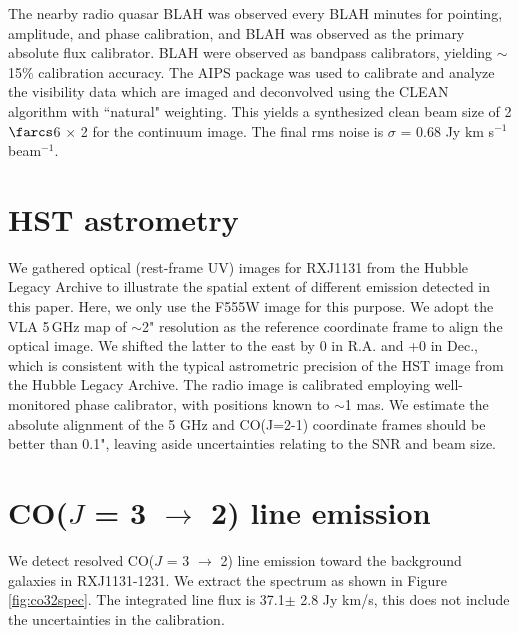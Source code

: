 The nearby radio quasar BLAH was observed every BLAH minutes for
pointing, amplitude, and phase calibration, and BLAH was observed as the
primary
absolute flux calibrator. BLAH were observed as bandpass calibrators, yielding
$\sim$15\% calibration accuracy.
The AIPS package was used to calibrate and analyze the visibility data which
are imaged and deconvolved using
the CLEAN algorithm with ``natural" weighting. This yields a synthesized clean
beam size of 2$\farcs$6 $\times$ 2 for the continuum image. The final
rms noise is $\sigma$ = 0.68 Jy km s$^{-1}$ beam$^{-1}$.


\section{HST astrometry}
We gathered optical (rest-frame UV) images for RXJ1131 from the Hubble Legacy Archive to illustrate the 
spatial extent of different emission detected in this paper. Here, we only use the F555W image for 
this purpose.
We adopt the VLA 5\,GHz map of $\sim$2" resolution as the reference coordinate frame to align the optical image. 
We shifted the latter to the east by 0 in R.A. and +0 in Dec., which is consistent with the typical astrometric precision of the HST image from the Hubble Legacy Archive. %
The radio image is calibrated employing well-monitored phase calibrator, with positions known to $\sim$1 mas.
We estimate the absolute alignment of the 5 GHz and CO(J=2-1) coordinate frames should
be better than 0.1", leaving aside uncertainties relating to the SNR and beam size.




\section{CO($J$ = 3 $\rightarrow$ 2) line emission}

% 

We detect resolved CO($J$ = 3 $\rightarrow$ 2) line emission toward the
background galaxies in RXJ1131-1231.
We extract the spectrum as shown in Figure
\ref{fig:co32spec}.
The integrated line flux is 37.1$\pm$ 2.8 Jy km/s, this does not include the uncertainties in 
the
calibration.

